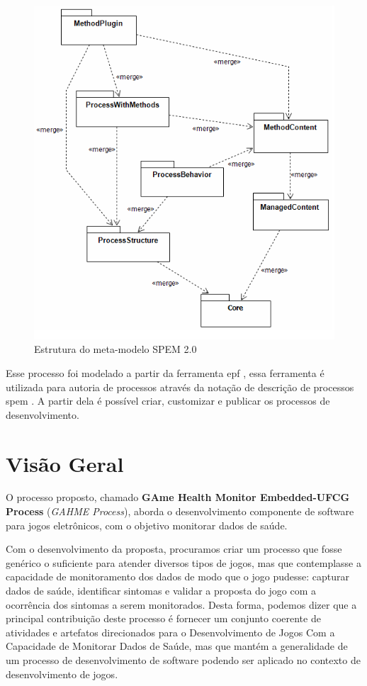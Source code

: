 \begin{figure}
 \centering
 \includegraphics[scale=0.5]{./img/spem20.png}
\caption{Estrutura do meta-modelo SPEM 2.0}
 \label{fig:spem20}
\end{figure}

Esse processo foi modelado a partir da ferramenta \ac{epf} \cite{epf13}, essa ferramenta é utilizada para autoria de processos através da notação de descrição de processos \ac{spem} \cite{spem08}. A partir dela é possível criar, customizar e publicar os processos de desenvolvimento.

\section{Visão Geral}
O processo proposto, chamado \textbf{GAme Health Monitor Embedded-UFCG Process} (\textit{GAHME Process}), aborda o desenvolvimento componente de software para jogos eletrônicos, com o objetivo monitorar dados de saúde. 

Com o desenvolvimento da proposta, procuramos criar um processo que fosse genérico o suficiente para atender diversos tipos de jogos, mas que contemplasse a capacidade de monitoramento dos dados de modo que o jogo pudesse: capturar dados de saúde, identificar sintomas e validar a proposta do jogo com a ocorrência dos sintomas a serem monitorados. Desta forma, podemos dizer que a principal contribuição deste processo é fornecer um conjunto coerente de atividades e artefatos direcionados para o Desenvolvimento de Jogos Com a Capacidade de Monitorar Dados de Saúde, mas que mantém a generalidade de um processo de desenvolvimento de software podendo ser aplicado no contexto de desenvolvimento de jogos.

